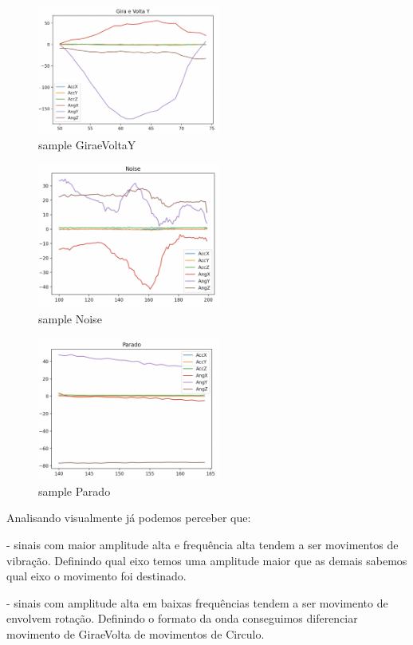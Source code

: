 \begin{figure}[H]
    \center
    \includegraphics[width=6cm]{images/sampleGiraeVoltaY.png}
    \caption{ sample GiraeVoltaY }
\end{figure}
\begin{figure}[H]
    \center
    \includegraphics[width=6cm]{images/sampleNoise.png}
    \caption{ sample Noise }
\end{figure}
\begin{figure}[H]
    \center
    \includegraphics[width=6cm]{images/sampleParado.png}
    \caption{ sample Parado }
\end{figure}

Analisando visualmente já podemos perceber que:

- sinais com maior amplitude alta e frequência alta tendem a ser movimentos de vibração.
Definindo qual eixo temos uma amplitude maior que as demais sabemos qual eixo o movimento foi destinado.

- sinais com amplitude alta em baixas frequências tendem a ser movimento de envolvem rotação.
Definindo o formato da onda conseguimos diferenciar movimento de GiraeVolta de movimentos de Circulo.

